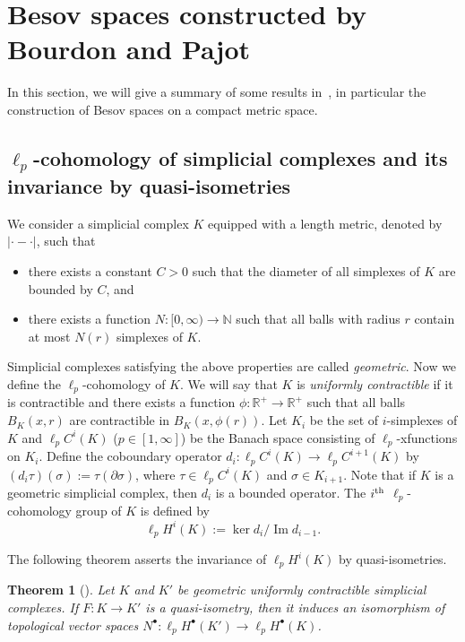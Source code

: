 \documentclass[10pt]{amsart}
\newtheorem{theo}{Theorem}[section]
\theoremstyle{definition}\newtheorem{defi}[theo]{Definition}\newtheorem{rema}[theo]{Remark}\newtheorem{exam}[theo]{Example}\newtheorem{exem}[theo]{Example}\newtheorem{nota}[theo]{Notation}
\DeclareMathOperator{\Ima}{Im}
\newcommand{\br}{\mathbb{R}}
\newcommand{\bn}{\mathbb{N}}
\begin{document}
\section{Besov spaces constructed by Bourdon and Pajot}\label{besov-bp}
In this section, we will give a summary of some results in~\cite{BP}, in particular the construction of Besov spaces on a compact metric space.

\subsection{\texorpdfstring{$\ell_p$}{lp}-cohomology of simplicial complexes and its invariance by quasi-isometries}

We consider a simplicial complex $K$ equipped with a length metric, denoted by $|\cdot-\cdot|$, such that
\begin{itemize}
\item there exists a constant $C>0$ such that the diameter of all simplexes of $K$ are bounded by $C$, and
\item there exists a function $N:[0,\infty)\rightarrow\bn$ such that all balls with radius $r$ contain at most $N(r)$ simplexes of $K$.
\end{itemize}
Simplicial complexes satisfying the above properties are called \emph{geometric}. Now we define the $\ell_p$-cohomology of $K$. We will say that $K$ is \emph{uniformly contractible} if it is contractible and there exists a function $\phi:\br^{+}\rightarrow\br^{+}$ such that all balls $B_K(x,r)$ are contractible in $B_K(x,\phi(r))$. Let $K_i$ be the set of $i$-simplexes of $K$ and $\ell_pC^i(K)$ ($p\in[1,\infty]$) be the Banach space consisting of $\ell_p$-xfunctions on $K_i$. Define the coboundary operator $d_i:\ell_pC^i(K)\rightarrow\ell_pC^{i+1}(K)$ by $(d_i\tau)(\sigma):=\tau(\partial\sigma)$, where $\tau\in\ell_pC^i(K)$ and $\sigma\in K_{i+1}$. Note that if $K$ is a geometric simplicial complex, then $d_i$ is a bounded operator. The $i^{\rm th}$ $\ell_p$-cohomology group of $K$ is defined by
\begin{equation*}
\ell_pH^i(K):=\ker{d_i}/\Ima d_{i-1}.
\end{equation*}

The following theorem asserts the invariance of $\ell_pH^i(K)$ by quasi-isometries.

\begin{theo}[{\cite[Theorem~1.1]{BP}}]\label{inv}
Let $K$ and $K'$ be geometric uniformly contractible simplicial complexes. If $F:K\rightarrow K'$ is a quasi-isometry, then it induces an isomorphism of topological vector spaces $N^{\bullet}:\ell_pH^{\bullet}(K')\rightarrow\ell_pH^{\bullet}(K)$.
\end{theo}
\end{document}
